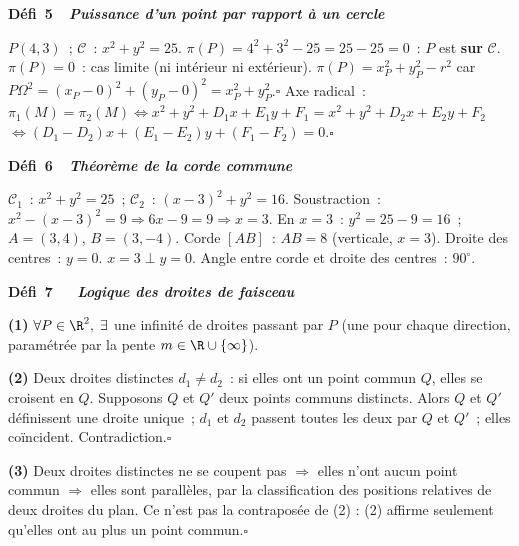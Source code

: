 \noindent{}
{\color{BO}\bfseries\small D\'efi~5~\textendash\ \textit{Puissance d'un point par rapport \`a un cercle}}
\par\smallskip

$P(4,3)$~; $\mathcal{C}$~: $x^2+y^2=25$.
$\pi(P)=4^2+3^2-25=25-25=0$~: $P$ est \textbf{sur} $\mathcal{C}$.\checkmark
$\pi(P)=0$~: cas limite (ni int\'erieur ni ext\'erieur).
$\pi(P)=x_P^2+y_P^2-r^2$ car $P\Omega^2=(x_P-0)^2+(y_P-0)^2=x_P^2+y_P^2$.\hfill$\square$
Axe radical~: $\pi_1(M)=\pi_2(M)\Leftrightarrow x^2+y^2+D_1x+E_1y+F_1=x^2+y^2+D_2x+E_2y+F_2$
$\Leftrightarrow(D_1-D_2)x+(E_1-E_2)y+(F_1-F_2)=0$.\hfill$\square$

\noindent{}
{\color{BO}\bfseries\small D\'efi~6~\textendash\ \textit{Th\'eor\`eme de la corde commune}}
\par\smallskip

$\mathcal{C}_1$~: $x^2+y^2=25$~; $\mathcal{C}_2$~: $(x-3)^2+y^2=16$.
Soustraction~: $x^2-(x-3)^2=9\Rightarrow6x-9=9\Rightarrow x=3$.
En $x=3$~: $y^2=25-9=16$~; $A=(3,4)$, $B=(3,-4)$.
Corde $[AB]$~: $AB=8$ (verticale, $x=3$).
Droite des centres~: $y=0$.
$x=3\perp y=0$.\checkmark
Angle entre corde et droite des centres~: $90^{\circ}$.

\noindent{}
{\color{BO}\bfseries\small D\'efi~7~\textendash\ \textit{\logiq\ Logique des droites de faisceau}}
\par\smallskip

\textbf{(1)} $\forall P\in\R^2,\;\exists$ une infinit\'e de droites passant par $P$
(une pour chaque direction, param\'etr\'ee par la pente $m\in\R\cup\{\infty\}$).

\textbf{(2)} Deux droites distinctes $d_1\ne d_2$~: si elles ont un point commun $Q$,
elles se croisent en $Q$. Supposons $Q$ et $Q'$ deux points communs distincts.
Alors $Q$ et $Q'$ d\'efinissent une droite unique~; $d_1$ et $d_2$ passent toutes les deux
par $Q$ et $Q'$~; elles co\"incident. Contradiction.\hfill$\square$

\textbf{(3)} Deux droites distinctes ne se coupent pas $\Rightarrow$ elles n'ont aucun point commun
$\Rightarrow$ elles sont parall\`eles, par la classification des positions
relatives de deux droites du plan. Ce n'est pas la contrapos\'ee de (2) :
(2) affirme seulement qu'elles ont au plus un point commun.\hfill$\square$

